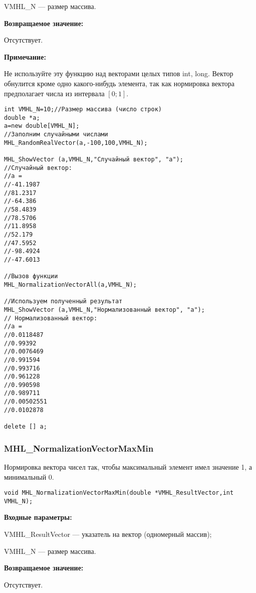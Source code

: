 \documentclass[a4paper,12pt]{article}
\begin{document}
 VMHL\_N --- размер массива.

\textbf{Возвращаемое значение:} 
 
Отсутствует.

\textbf{Примечание:} 

Не используйте эту функцию над векторами целых типов int, long. Вектор обнулится кроме одно какого-нибудь элемента, так как нормировка вектора предполагает числа из интервала $[0;1]$.


\begin{lstlisting}[label=code_use_MHL_NormalizationVectorAll,caption=Пример использования]
int VMHL_N=10;//Размер массива (число строк)
double *a;
a=new double[VMHL_N];
//Заполним случайными числами
MHL_RandomRealVector(a,-100,100,VMHL_N);

MHL_ShowVector (a,VMHL_N,"Случайный вектор", "a");
//Случайный вектор:
//a =
//-41.1987
//81.2317
//-64.386
//58.4839
//78.5706
//11.8958
//52.179
//47.5952
//-98.4924
//-47.6013

//Вызов функции
MHL_NormalizationVectorAll(a,VMHL_N);

//Используем полученный результат
MHL_ShowVector (a,VMHL_N,"Нормализованный вектор", "a");
// Нормализованный вектор:
//a =
//0.0118487
//0.99392
//0.0076469
//0.991594
//0.993716
//0.961228
//0.990598
//0.989711
//0.00502551
//0.0102878

delete [] a;
\end{lstlisting}

\subsubsection{MHL\_NormalizationVectorMaxMin}\label{MHL_NormalizationVectorMaxMin}

Нормировка вектора чисел так, чтобы максимальный элемент имел значение 1, а минимальный 0.


\begin{lstlisting}[label=code_syntax_MHL_NormalizationVectorMaxMin,caption=Синтаксис]
void MHL_NormalizationVectorMaxMin(double *VMHL_ResultVector,int VMHL_N);
\end{lstlisting}

\textbf{Входные параметры:}

 VMHL\_ResultVector --- указатель на вектор (одномерный массив);
 
 VMHL\_N --- размер массива.

\textbf{Возвращаемое значение:} 
 
Отсутствует.
\end{document}
